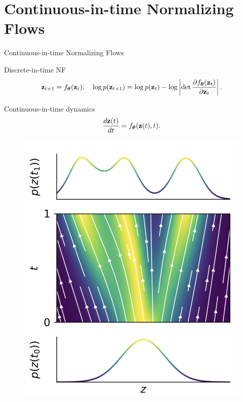 \section{Continuous-in-time Normalizing Flows}
\begin{frame}{Continuous-in-time Normalizing Flows}
	\vspace{-0.3cm}
	\begin{block}{Discrete-in-time NF}
		\vspace{-0.8cm}
		  \[
		  \mathbf{z}_{t+1} = f_{\boldsymbol{\theta}}(\mathbf{z}_t); \quad \log p(\mathbf{z}_{t+1}) = \log p(\mathbf{z}_{t}) - \log \left| \det \frac{\partial f_{\boldsymbol{\theta}}(\mathbf{z}_t)}{\partial \mathbf{z}_{t}} \right| .
		  \]
		\vspace{-0.7cm}
	\end{block}
	\begin{block}{Continuous-in-time dynamics}
		\vspace{-0.2cm}
		\[
			\frac{d\mathbf{z}(t)}{dt} = f_{\boldsymbol{\theta}}(\mathbf{z}(t), t).
		\]
	\end{block}
	\vspace{-0.6cm}
	\begin{minipage}[t]{0.4\columnwidth}
		\begin{figure}
			\centering
			\includegraphics[width=0.75\linewidth]{figs/cnf_flow.png}
		\end{figure}
	\end{minipage}%
	\begin{minipage}[t]{0.6\columnwidth}
		\begin{figure}

\end{figure}
\end{minipage}
\end{frame}
